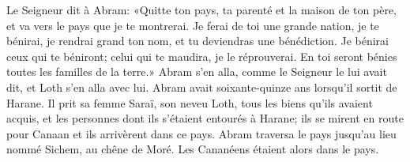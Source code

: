 Le Seigneur dit à Abram:
	«Quitte ton pays, ta parenté et la maison de ton père,
	et va vers le pays que je te montrerai.
Je ferai de toi une grande nation, je te bénirai,
	je rendrai grand ton nom, et tu deviendras une bénédiction.
Je bénirai ceux qui te béniront; celui qui te maudira, je le réprouverai.
	En toi seront bénies toutes les familles de la terre.»
Abram s’en alla, comme le Seigneur le lui avait dit,
	et Loth s’en alla avec lui.
	Abram avait soixante-quinze ans lorsqu’il sortit de Harane.
Il prit sa femme Saraï, son neveu Loth, tous les biens qu’ils avaient acquis,
	et les personnes dont ils s’étaient entourés à Harane;
	ils se mirent en route pour Canaan et ils arrivèrent dans ce pays.
Abram traversa le pays jusqu’au lieu nommé Sichem, au chêne de Moré.
	Les Cananéens étaient alors dans le pays.
